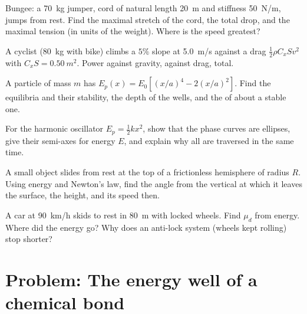 \begin{exercise}[$\star\star$]\label{exo:b1:work-and-energy:7}
Bungee: a \qty{70}{kg} jumper, cord of natural length \qty{20}{m} and
stiffness \qty{50}{N/m}, jumps from rest. Find the maximal stretch of
the cord, the total drop, and the maximal tension (in units of the
weight). Where is the speed greatest?
\end{exercise}

\begin{exercise}[$\star\star$]\label{exo:b1:work-and-energy:8}
A cyclist (\qty{80}{kg} with bike) climbs a $5\%$ slope at \qty{5.0}{m/s}
against a drag $\tfrac12\rho C_xSv^2$ with $C_xS = \qty{0.50}{m^2}$.
Power against gravity, against drag, total.
\end{exercise}

\begin{exercise}[$\star\star$]\label{exo:b1:work-and-energy:9}
A particle of mass $m$ has $E_p(x) = E_0[(x/a)^4 - 2(x/a)^2]$. Find the
equilibria and their stability, the depth of the wells, and the  of  about a stable one.
\end{exercise}

\begin{exercise}[$\star\star\star$]\label{exo:b1:work-and-energy:10}
For the harmonic oscillator $E_p = \tfrac12 kx^2$, show that the phase
curves are ellipses, give their semi-axes for energy $E$, and explain
why all are traversed in the same time.
\end{exercise}

\begin{exercise}[$\star\star\star$]\label{exo:b1:work-and-energy:11}
A small object slides from rest at the top of a frictionless hemisphere
of radius $R$. Using energy and Newton's law, find the angle from the
vertical at which it leaves the surface, the height, and its speed
then.
\end{exercise}

\begin{exercise}[$\star\star\star$]\label{exo:b1:work-and-energy:12}
A car at \qty{90}{km/h} skids to rest in \qty{80}{m} with locked
wheels. Find $\mu_d$ from energy. Where did the energy go? Why does an
anti-lock system (wheels kept rolling) stop shorter?
\end{exercise}

\section{Problem: The energy well of a chemical bond}

